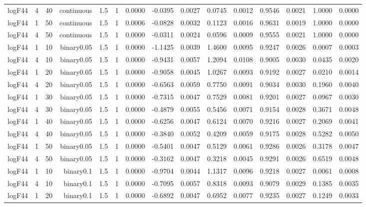 \begin{longtable}{rrrrrrrrrrrrrrr}
  logF44 & 4 & 40 & continuous & 1.5 & 1 & 0.0000 & -0.0395 & 0.0027 & 0.0745 & 0.0012 & 0.9546 & 0.0021 & 1.0000 & 0.0000 \\ 
  logF44 & 1 & 50 & continuous & 1.5 & 1 & 0.0006 & -0.0828 & 0.0032 & 0.1123 & 0.0016 & 0.9631 & 0.0019 & 1.0000 & 0.0000 \\ 
  logF44 & 4 & 50 & continuous & 1.5 & 1 & 0.0000 & -0.0311 & 0.0024 & 0.0596 & 0.0009 & 0.9555 & 0.0021 & 1.0000 & 0.0000 \\ 
  logF44 & 1 & 10 & binary0.05 & 1.5 & 1 & 0.0000 & -1.1425 & 0.0039 & 1.4600 & 0.0095 & 0.9247 & 0.0026 & 0.0007 & 0.0003 \\ 
  logF44 & 4 & 10 & binary0.05 & 1.5 & 1 & 0.0000 & -0.9431 & 0.0057 & 1.2094 & 0.0108 & 0.9005 & 0.0030 & 0.0435 & 0.0020 \\ 
  logF44 & 1 & 20 & binary0.05 & 1.5 & 1 & 0.0000 & -0.9058 & 0.0045 & 1.0267 & 0.0093 & 0.9192 & 0.0027 & 0.0210 & 0.0014 \\ 
  logF44 & 4 & 20 & binary0.05 & 1.5 & 1 & 0.0000 & -0.6563 & 0.0059 & 0.7750 & 0.0091 & 0.9034 & 0.0030 & 0.1960 & 0.0040 \\ 
  logF44 & 1 & 30 & binary0.05 & 1.5 & 1 & 0.0000 & -0.7315 & 0.0047 & 0.7529 & 0.0081 & 0.9201 & 0.0027 & 0.0967 & 0.0030 \\ 
  logF44 & 4 & 30 & binary0.05 & 1.5 & 1 & 0.0000 & -0.4879 & 0.0055 & 0.5456 & 0.0071 & 0.9154 & 0.0028 & 0.3671 & 0.0048 \\ 
  logF44 & 1 & 40 & binary0.05 & 1.5 & 1 & 0.0000 & -0.6256 & 0.0047 & 0.6124 & 0.0070 & 0.9216 & 0.0027 & 0.2069 & 0.0041 \\ 
  logF44 & 4 & 40 & binary0.05 & 1.5 & 1 & 0.0000 & -0.3840 & 0.0052 & 0.4209 & 0.0059 & 0.9175 & 0.0028 & 0.5282 & 0.0050 \\ 
  logF44 & 1 & 50 & binary0.05 & 1.5 & 1 & 0.0000 & -0.5401 & 0.0047 & 0.5129 & 0.0061 & 0.9286 & 0.0026 & 0.3178 & 0.0047 \\ 
  logF44 & 4 & 50 & binary0.05 & 1.5 & 1 & 0.0000 & -0.3162 & 0.0047 & 0.3218 & 0.0045 & 0.9291 & 0.0026 & 0.6519 & 0.0048 \\ 
  logF44 & 1 & 10 & binary0.1 & 1.5 & 1 & 0.0000 & -0.9704 & 0.0044 & 1.1317 & 0.0096 & 0.9218 & 0.0027 & 0.0061 & 0.0008 \\ 
  logF44 & 4 & 10 & binary0.1 & 1.5 & 1 & 0.0000 & -0.7095 & 0.0057 & 0.8318 & 0.0093 & 0.9079 & 0.0029 & 0.1385 & 0.0035 \\ 
  logF44 & 1 & 20 & binary0.1 & 1.5 & 1 & 0.0000 & -0.6892 & 0.0047 & 0.6952 & 0.0077 & 0.9235 & 0.0027 & 0.1249 & 0.0033 \\ 

\end{longtable}
